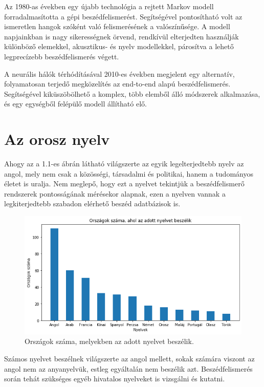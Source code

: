 Az 1980-as években egy újabb technológia a rejtett Markov modell forradalmasította a gépi beszédfelismerést. Segítségével pontosítható volt az ismeretlen hangok szóként való felismerésének a valószínűsége. A modell napjainkban is nagy sikerességnek örvend, rendkívül elterjedten használják különböző elemekkel, akusztikus- és nyelv modellekkel, párosítva a lehető legprecízebb beszédfelismerés végett.

A neurális hálók térhódításával 2010-es években megjelent egy alternatív, folyamatosan terjedő megközelítés az end-to-end alapú beszédfelismerés. Segítségével kiküszöbölhető a komplex, több elemből álló módszerek alkalmazása, és egy egységből felépülő modell állítható elő.

\section{Az orosz nyelv}

Ahogy az a 1.1-es ábrán látható világszerte az egyik legelterjedtebb nyelv az angol, mely nem csak a közösségi, társadalmi és politikai, hanem a tudományos életet is uralja. Nem meglepő, hogy ezt a nyelvet tekintjük a beszédfelismerő rendszerek pontosságának mérésekor alapnak, ezen a nyelven vannak a legkiterjedtebb szabadon elérhető beszéd adatbázisok is.

\begin{figure}[!ht]
\centering
\includegraphics[width=150mm, keepaspectratio]{figures/languagesInCountries.png}
\caption{Országok száma, melyekben az adott nyelvet beszélik. \cite{nyelvekvilaga}}
\end{figure}

Számos nyelvet beszélnek világszerte az angol mellett, sokak számára viszont az angol nem az anyanyelvük, estleg egyáltalán nem beszélik azt. Beszédfelismerés során tehát szükséges egyéb hivatalos nyelveket is vizsgálni és kutatni.

